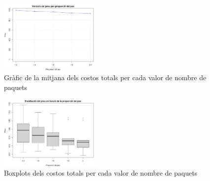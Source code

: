 \documentclass[a4paper]{article}
\begin{document}
	\begin{figure}[H]
		\centering
		\includegraphics[width=0.45\textwidth]{exp5_grafic_lineal.png}
		\caption{Gràfic de la mitjana dels costos totals per cada valor de nombre de paquets}
		\label{fig:exp5_grafic_lineal}
	\end{figure}
	\begin{figure}[H]
		\centering
		\includegraphics[width=0.45\textwidth]{images/exp5_boxplot.png}
		\caption{Boxplots dels costos totals per cada valor de nombre de paquets}
		\label{fig:exp5_boxplot}
	\end{figure}
	
\end{document}
